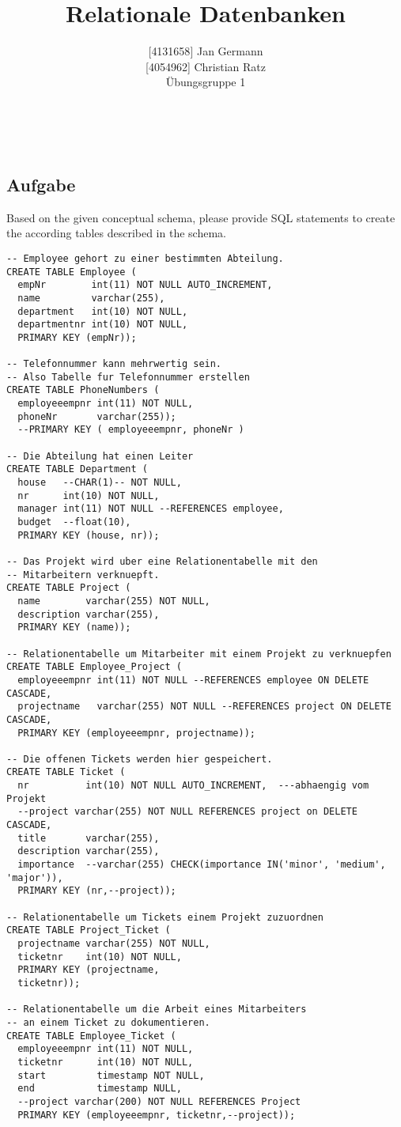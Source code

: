 \documentclass[11pt,a4paper,DIV=9]{scrartcl}
\author{{[}4131658{]} Jan Germann \\{[}4054962{]} Christian Ratz\\Übungsgruppe 1}
\title{Relationale Datenbanken}
\newcounter{temp}
\newcommand{\aufgabe}[1]{
  \setcounter{temp}{\value{subsection}}
  \setcounter{subsection}{#1}
  \addtocounter{subsection}{-1}
  \subsection{Aufgabe}
  \setcounter{subsection}{\value{temp}}
}
\renewcommand{\author}[1]{\renewcommand{\author}{#1}}
\renewcommand{\title}[1]{\renewcommand{\title}{#1}}
\newcommand{\makehomeworktitle}{
  \begin{minipage}[t]{6.5cm}
    \sf{\author}
  \end{minipage}
  \begin{minipage}[t]{6.5cm}
    \begin{flushright}
      \sf{\title\\\today}
    \end{flushright}
  \end{minipage}
  \\[0.2cm]
  \begin{center}
    \sf{
      \color{blue}{
        \LARGE{Aufgabenblatt \blattnr}
      }
    }
  \end{center}
  \vspace{0.1cm}
}
\begin{document}
\makehomeworktitle
   \aufgabe{1}
   Based on the given conceptual schema, please provide SQL statements to create the according tables described in the schema.
\begin{lstlisting}
-- Employee gehort zu einer bestimmten Abteilung.
CREATE TABLE Employee (
  empNr        int(11) NOT NULL AUTO_INCREMENT, 
  name         varchar(255), 
  department   int(10) NOT NULL, 
  departmentnr int(10) NOT NULL, 
  PRIMARY KEY (empNr));

-- Telefonnummer kann mehrwertig sein. 
-- Also Tabelle fur Telefonnummer erstellen
CREATE TABLE PhoneNumbers (
  employeeempnr int(11) NOT NULL, 
  phoneNr       varchar(255));
  --PRIMARY KEY ( employeeempnr, phoneNr )
  
-- Die Abteilung hat einen Leiter
CREATE TABLE Department (
  house   --CHAR(1)-- NOT NULL, 
  nr      int(10) NOT NULL, 
  manager int(11) NOT NULL --REFERENCES employee,
  budget  --float(10), 
  PRIMARY KEY (house, nr));

-- Das Projekt wird uber eine Relationentabelle mit den
-- Mitarbeitern verknuepft.
CREATE TABLE Project (
  name        varchar(255) NOT NULL, 
  description varchar(255), 
  PRIMARY KEY (name));

-- Relationentabelle um Mitarbeiter mit einem Projekt zu verknuepfen
CREATE TABLE Employee_Project (
  employeeempnr int(11) NOT NULL --REFERENCES employee ON DELETE CASCADE,
  projectname   varchar(255) NOT NULL --REFERENCES project ON DELETE CASCADE,
  PRIMARY KEY (employeeempnr, projectname));

-- Die offenen Tickets werden hier gespeichert.
CREATE TABLE Ticket (
  nr          int(10) NOT NULL AUTO_INCREMENT,  ---abhaengig vom Projekt
  --project varchar(255) NOT NULL REFERENCES project on DELETE CASCADE,
  title       varchar(255), 
  description varchar(255), 
  importance  --varchar(255) CHECK(importance IN('minor', 'medium', 'major')),
  PRIMARY KEY (nr,--project));

-- Relationentabelle um Tickets einem Projekt zuzuordnen
CREATE TABLE Project_Ticket (
  projectname varchar(255) NOT NULL, 
  ticketnr    int(10) NOT NULL, 
  PRIMARY KEY (projectname, 
  ticketnr));

-- Relationentabelle um die Arbeit eines Mitarbeiters
-- an einem Ticket zu dokumentieren.
CREATE TABLE Employee_Ticket (
  employeeempnr int(11) NOT NULL, 
  ticketnr      int(10) NOT NULL, 
  start         timestamp NOT NULL, 
  end           timestamp NULL, 
  --project varchar(200) NOT NULL REFERENCES Project
  PRIMARY KEY (employeeempnr, ticketnr,--project));


\end{lstlisting}
\end{document}

